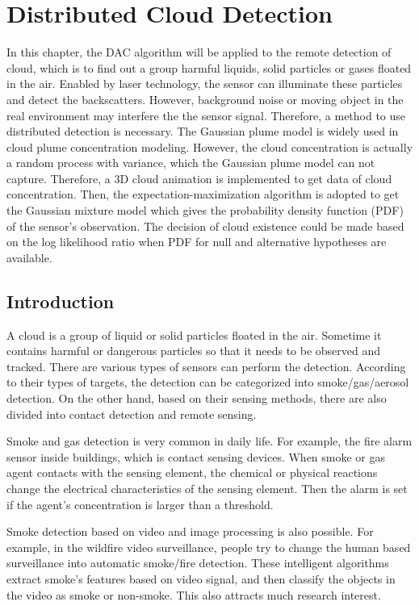 
\chapter{\label{sec:DAC-Implementation:-Distributed} Distributed Cloud Detection }

In this chapter, the DAC algorithm will be applied to the remote detection
of cloud, which is to find out a group harmful liquids, solid particles
or gases floated in the air. Enabled by laser technology, the sensor
can illuminate these particles and detect the backscatters. However,
background noise or moving object in the real environment may interfere
the the sensor signal. Therefore, a method to use distributed detection
is necessary. The Gaussian plume model is widely used in cloud plume
concentration modeling. However, the cloud concentration is actually
a random process with variance, which the Gaussian plume model can
not capture. Therefore, a 3D cloud animation is implemented to get
data of cloud concentration. Then, the expectation-maximization algorithm
is adopted to get the Gaussian mixture model which gives the probability
density function (PDF) of the sensor\textquoteright{}s observation.
The decision of cloud existence could be made based on the log likelihood
ratio when PDF for null and alternative hypotheses are available. 


\section{Introduction }

A cloud is a group of liquid or solid particles floated in the air.
Sometime it contains harmful or dangerous particles so that it needs
to be observed and tracked. There are various types of sensors can
perform the detection. According to their types of targets, the detection
can be categorized into smoke/gas/aerosol detection. On the other
hand, based on their sensing methods, there are also divided into
contact detection and remote sensing. 

Smoke and gas detection is very common in daily life. For example,
the fire alarm sensor inside buildings, which is contact sensing devices.
When smoke or gas agent contacts with the sensing element, the chemical
or physical reactions change the electrical characteristics of the
sensing element. Then the alarm is set if the agent's concentration
is larger than a threshold.  

Smoke detection based on video and image processing is also possible.
For example, in the wildfire video surveillance, people try to change
the human based surveillance into automatic smoke/fire detection.
These intelligent algorithms extract smoke's features based on video
signal, and then classify the objects in the video as smoke or non-smoke.
This also attracts much research interest. 

